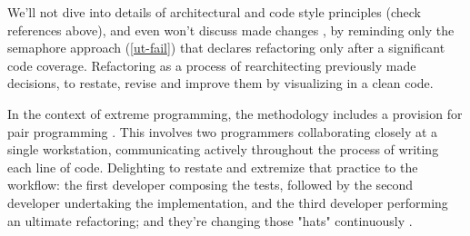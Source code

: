 \noindent We'll not dive into details of architectural and code style principles (check references above), and even 
won't discuss made changes , by reminding only the semaphore approach (\ref{ut-fail}) that declares 
refactoring only after a significant code coverage. Refactoring as a process of rearchitecting \cite{Chec23} previously
made decisions, to restate, revise and improve them by visualizing in a clean code. 

In the context of extreme programming, the methodology includes a provision for pair programming \cite{Ligu19}. This 
involves two programmers collaborating closely at a single workstation, communicating actively throughout the process 
of writing each line of code. Delighting to restate and extremize that practice to the workflow: the first developer 
composing the tests, followed by the second developer undertaking the implementation, and the third developer 
performing an ultimate refactoring; and they're changing those "hats" continuously \cite{Bono17}.
